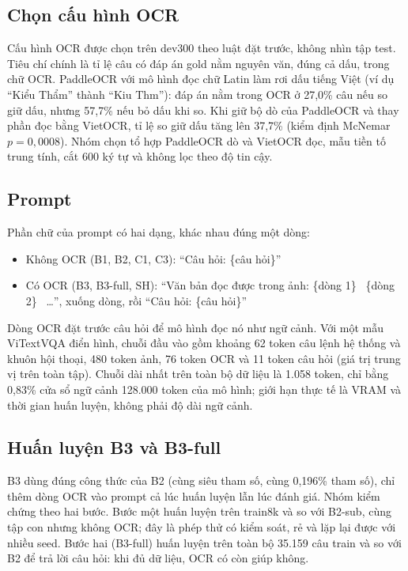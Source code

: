 \subsection{Chọn cấu hình OCR}

Cấu hình OCR được chọn trên dev300 theo luật đặt trước, không nhìn tập test.
Tiêu chí chính là tỉ lệ câu có đáp án gold nằm nguyên văn, đúng cả dấu, trong chữ
OCR. PaddleOCR với mô hình đọc chữ Latin làm rơi dấu tiếng Việt (ví dụ ``Kiểu
Thẩm'' thành ``Kiu Thm''): đáp án nằm trong OCR ở 27,0\% câu nếu so giữ dấu,
nhưng 57,7\% nếu bỏ dấu khi so. Khi giữ bộ dò của PaddleOCR và thay phần đọc bằng
VietOCR, tỉ lệ so giữ dấu tăng lên 37,7\% (kiểm định McNemar $p = 0{,}0008$).
Nhóm chọn tổ hợp PaddleOCR dò và VietOCR đọc, mẫu tiền tố trung tính, cắt 600 ký
tự và không lọc theo độ tin cậy.

\subsection{Prompt}
\label{sec:met-prompt}

Phần chữ của prompt có hai dạng, khác nhau đúng một dòng:

\begin{itemize}
  \item Không OCR (B1, B2, C1, C3): ``Câu hỏi: \{câu hỏi\}''
  \item Có OCR (B3, B3-full, SH): ``Văn bản đọc được trong ảnh: \{dòng 1\}
  \textbar\ \{dòng 2\} \textbar\ \ldots'', xuống dòng, rồi
  ``Câu hỏi: \{câu hỏi\}''
\end{itemize}

Dòng OCR đặt trước câu hỏi để mô hình đọc nó như ngữ cảnh. Với một mẫu ViTextVQA
điển hình, chuỗi đầu vào gồm khoảng 62 token câu lệnh hệ thống và khuôn hội
thoại, 480 token ảnh, 76 token OCR và 11 token câu hỏi (giá trị trung vị trên
toàn tập). Chuỗi dài nhất trên toàn bộ dữ liệu là 1.058 token, chỉ bằng 0,83\%
cửa sổ ngữ cảnh 128.000 token của mô hình; giới hạn thực tế là VRAM và thời gian
huấn luyện, không phải độ dài ngữ cảnh.

\subsection{Huấn luyện B3 và B3-full}

B3 dùng đúng công thức của B2 (cùng siêu tham số, cùng 0,196\% tham số), chỉ thêm
dòng OCR vào prompt cả lúc huấn luyện lẫn lúc đánh giá. Nhóm kiểm chứng theo hai
bước. Bước một huấn luyện trên train8k và so với B2-sub, cùng tập con nhưng không
OCR; đây là phép thử có kiểm soát, rẻ và lặp lại được với nhiều seed. Bước hai
(B3-full) huấn luyện trên toàn bộ 35.159 câu train và so với B2 để trả lời câu
hỏi: khi đủ dữ liệu, OCR có còn giúp không.

